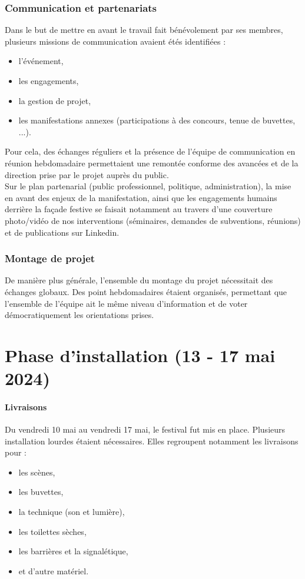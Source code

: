 \documentclass[12pt,a4paper]{report}
\begin{document}
\subsubsection{Communication et partenariats}
Dans le but de mettre en avant le travail fait bénévolement par ses membres, plusieurs missions de communication avaient étés identifiées :
\begin{itemize}
\item l'événement,
\item les engagements,
\item la gestion de projet,
\item les manifestations annexes (participations à des concours, tenue de buvettes, ...).\\
\end{itemize}

Pour cela, des échanges réguliers et la présence de l'équipe de communication en réunion hebdomadaire permettaient une remontée conforme des avancées et de la direction prise par le projet auprès du public.\\

Sur le plan partenarial (public professionnel, politique, administration), la mise en avant des enjeux de la manifestation, ainsi que les engagements humains derrière la façade festive se faisait notamment au travers d'une couverture photo/vidéo de nos interventions (séminaires, demandes de subventions, réunions) et de publications sur Linkedin.


\subsubsection{Montage de projet}
De manière plus générale, l'ensemble du montage du projet nécessitait des échanges globaux. Des point hebdomadaires étaient organisés, permettant que l'ensemble de l'équipe ait le même niveau d'information et de voter démocratiquement les orientations prises.

\section{Phase d'installation (13 - 17 mai 2024)}

\paragraph{Livraisons}

Du vendredi 10 mai au vendredi 17 mai, le festival fut mis en place. Plusieurs installation lourdes étaient nécessaires. Elles regroupent notamment les livraisons pour : 
\begin{itemize}
\item les scènes,
\item les buvettes,
\item la technique (son et lumière),
\item les toilettes sèches, 
\item les barrières et la signalétique,
\item et d'autre matériel.
\end{itemize}
\end{document}
